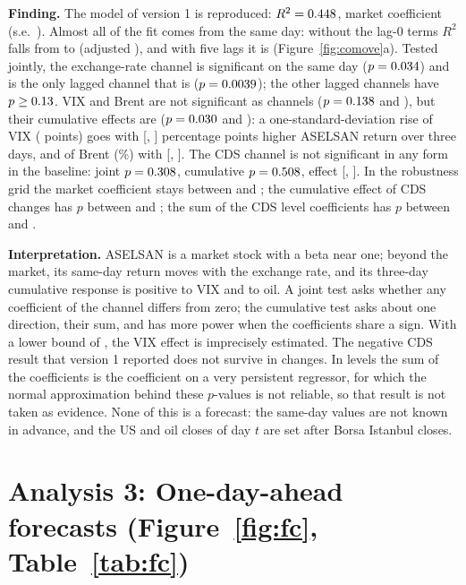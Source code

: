 \documentclass[11pt,a4paper]{article}
\begin{document}
\textbf{Finding.} The model of version 1 is reproduced: $R^2 = 0.448$, market coefficient \BetaBist{} (s.e.\ \BetaBistSe). Almost
all of the fit comes from the same day: without the lag-0 terms $R^2$ falls from \RsqSameB{} to \RsqLagB{} (adjusted
\AdjRsqLagB), and with five lags it is \RsqLagD{} (Figure~\ref{fig:comove}a). Tested jointly, the exchange-rate channel
is significant on the same day ($p = 0.034$) and is the only lagged channel that is ($p = 0.0039$); the other lagged
channels have $p \ge 0.13$. VIX and Brent are not significant as channels ($p = 0.138$ and \BrentJointP), but their
cumulative effects are ($p = 0.030$ and \BrentSumP): a one-standard-deviation rise of VIX (\SdVix{} points) goes with
\EffVix{} [\EffLoVix, \EffHiVix] percentage points higher ASELSAN return over three days, and of Brent (\SdBrent\%) with \EffBrent{}
[\EffLoBrent, \EffHiBrent]. The CDS channel is not significant in any form in the baseline: joint $p = 0.308$, cumulative $p =
0.508$, effect \EffCds{} [\EffLoCds, \EffHiCds]. In the robustness grid the market coefficient stays between \RobBetaMin{} and
\RobBetaMax; the cumulative effect of CDS changes has $p$ between \RobCumCdsPmin{} and \RobCumCdsPmax; the sum of the CDS level
coefficients has $p$ between \RobCumCdsLevelPmin{} and \RobCumCdsLevelPmax.

\textbf{Interpretation.} ASELSAN is a market stock with a beta near one; beyond the market, its same-day return moves with the
exchange rate, and its three-day cumulative response is positive to VIX and to oil. A joint test asks whether any coefficient of
the channel differs from zero; the cumulative test asks about one direction, their sum, and has more power when the coefficients
share a sign. With a lower bound of \EffLoVix{}, the VIX effect is imprecisely estimated. The negative CDS result that version 1 reported does not survive in changes. In levels the
sum of the coefficients is the coefficient on a very persistent regressor, for which the normal approximation behind these
$p$-values is not reliable, so that result is not taken as evidence. None of this is a forecast: the same-day values are not
known in advance, and the US and oil closes of day $t$ are set after Borsa Istanbul closes.

\section{Analysis 3: One-day-ahead forecasts (Figure~\ref{fig:fc}, Table~\ref{tab:fc})}
\end{document}
